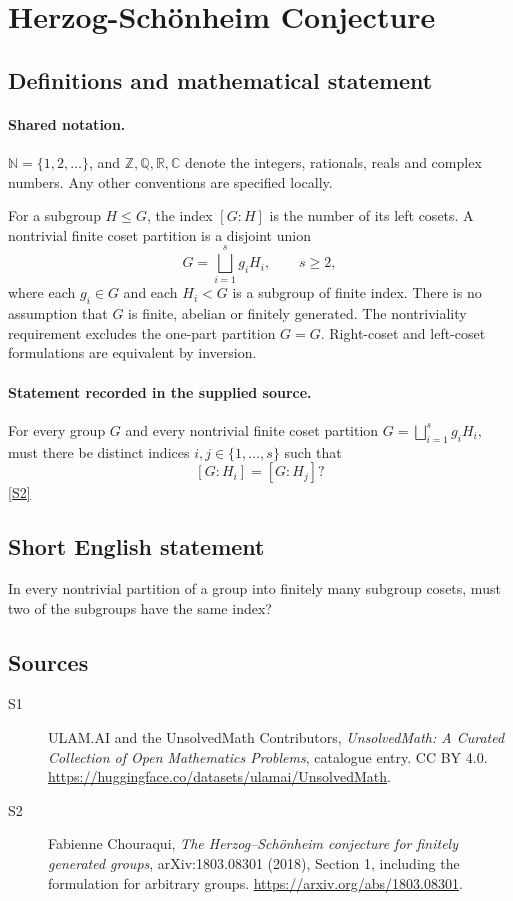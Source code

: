 \documentclass[11pt]{article}
\newcommand{\sref}[2]{\hyperlink{source:#1:#2}{[S#2]}}
\begin{document}
\section{Herzog-Schönheim Conjecture}\label{statement}

\subsection{Definitions and mathematical statement}

\paragraph{Shared notation.}$\mathbb N=\{1,2,\ldots\}$, and $\mathbb Z,\mathbb Q,\mathbb R,\mathbb C$ denote the integers, rationals, reals and complex numbers. Any other conventions are specified locally.


For a subgroup \(H\le G\), the index \([G:H]\) is the number of its
left cosets.  A nontrivial finite coset partition is a disjoint union
\[
 G=\bigsqcup_{i=1}^{s} g_iH_i,\qquad s\ge2,
\]
where each \(g_i\in G\) and each \(H_i<G\) is a subgroup of finite index.
There is no assumption that \(G\) is finite, abelian or finitely generated.
The nontriviality requirement excludes the one-part partition \(G=G\).
Right-coset and left-coset formulations are equivalent by inversion.
\paragraph{Statement recorded in the supplied source.}
For every group \(G\) and every nontrivial finite coset partition
\(G=\bigsqcup_{i=1}^{s}g_iH_i\), must there be distinct indices
\(i,j\in\{1,\ldots,s\}\) such that
\[
 [G:H_i]=[G:H_j]?
\] \sref{statement}{2}
\subsection{Short English statement}
In every nontrivial partition of a group into finitely many subgroup cosets, must two of the subgroups have the same index?
\subsection{Sources}
\begin{description}
\item[\hypertarget{source:statement:1}{S1}] ULAM.AI and the UnsolvedMath Contributors, \emph{UnsolvedMath: A Curated Collection of Open Mathematics Problems}, catalogue entry. CC BY 4.0. \url{https://huggingface.co/datasets/ulamai/UnsolvedMath}.
\item[\hypertarget{source:statement:2}{S2}] Fabienne Chouraqui, \emph{The Herzog--Sch\"onheim conjecture for finitely generated groups}, arXiv:1803.08301 (2018), Section 1, including the formulation for arbitrary groups. \url{https://arxiv.org/abs/1803.08301}.
\end{description}
\label{end:statement}
\end{document}
